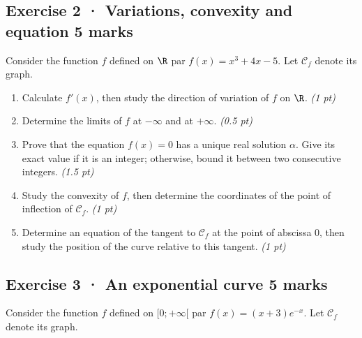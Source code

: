 \subsection*{Exercise 2 · Variations, convexity and equation \hfill 5 marks}Consider the function $f$ defined on $\R$ par $f(x)=x^3+4x-5$. Let $\mathcal C_f$ denote its graph.

\begin{enumerate}

\item Calculate $f'(x)$, then study the direction of variation of $f$ on $\R$. \hfill\textit{(1 pt)}

\item Determine the limits of $f$ at $-\infty$ and at $+\infty$. \hfill\textit{(0.5 pt)}

\item Prove that the equation $f(x)=0$ has a unique real solution $\alpha$. Give its exact value if it is an integer; otherwise, bound it between two consecutive integers. \hfill\textit{(1.5 pt)}

\item Study the convexity of $f$, then determine the coordinates of the point of inflection of $\mathcal C_f$. \hfill\textit{(1 pt)}

\item Determine an equation of the tangent to $\mathcal C_f$ at the point of abscissa $0$, then study the position of the curve relative to this tangent. \hfill\textit{(1 pt)}

\end{enumerate}

\clearpage{}\par

\subsection*{Exercise 3 · An exponential curve \hfill 5 marks}Consider the function $f$ defined on $[0;+\infty[$ par $f(x)=(x+3)e^{-x}$. Let $\mathcal C_f$ denote its graph.

